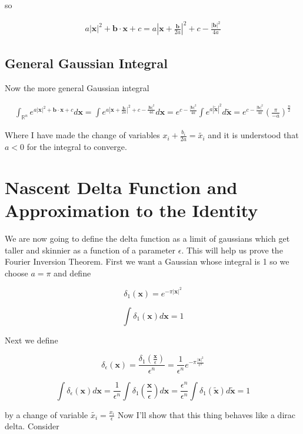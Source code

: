 \documentclass[12pt]{article}
\newcommand{\bv}[1]{\boldsymbol{#1}}
\newcommand{\ep}{\epsilon}
\begin{document}
so

\begin{align}
a |\bv{x}|^2 + \bv{b}\cdot\bv{x} + c = a\left|\bv{x}+\frac{\bv{b}}{2a}\right|^2 + c -\frac{|\bv{b}|^2}{4a}
\end{align}

\subsection{General Gaussian Integral}

Now the more general Gaussian integral

\begin{align}
\int_{\mathbb{R}^n} e^{a|\bv{x}|^2+\bv{b}\cdot\bv{x}+c} d\bv{x} = \int e^{a\left|\bv{x}+\frac{\bv{b}}{2a}\right|^2 + c - \frac{|\bv{b}|^2}{4a}} d\bv{x} = e^{c-\frac{|\bv{b}|^2}{4a}} \int e^{a |\tilde{\bv{x}}|^2} d\tilde{\bv{x}} = e^{c-\frac{|\bv{b}|^2}{4a}} \left(\frac{\pi}{-a}\right)^{\frac{n}{2}}
\end{align}

Where I have made the change of variables $x_i+\frac{b_i}{2a} = \tilde{x_i}$ and it is understood that $a<0$ for the integral to converge.


\section{Nascent Delta Function and Approximation to the Identity}

We are now going to define the delta function as a limit of gaussians which get taller and skinnier as a function of a parameter $\epsilon$. This will help us prove the Fourier Inversion Theorem. First we want a Gaussian whose integral is 1 so we choose $a=\pi$ and define

\[
\delta_1(\bv{x}) = e^{-\pi |\bv{x}|^2}
\]

\[
\int \delta_1(\bv{x}) d\bv{x} = 1
\]

Next we define

\[\delta{_\ep}(\bv{x}) = \frac{\delta_1(\frac{\bv{x}}{\ep})}{\ep^n} = \frac{1}{\ep^n} e^{-\pi \frac{|\bv{x}|^2}{\ep^2}}\]

\[\int \delta_{\ep}(\bv{x})d\bv{x} = \frac{1}{\ep^n} \int \delta_1\left(\frac{\bv{x}}{\ep}\right) d\bv{x} = \frac{\ep^n}{\ep^n} \int \delta_1(\tilde{\bv{x}}) d \tilde{\bv{x}} = 1
\]

by a change of variable $\tilde{x_i} = \frac{x_i}{\ep}$
Now I'll show that this thing behaves like a dirac delta. Consider
\end{document}
